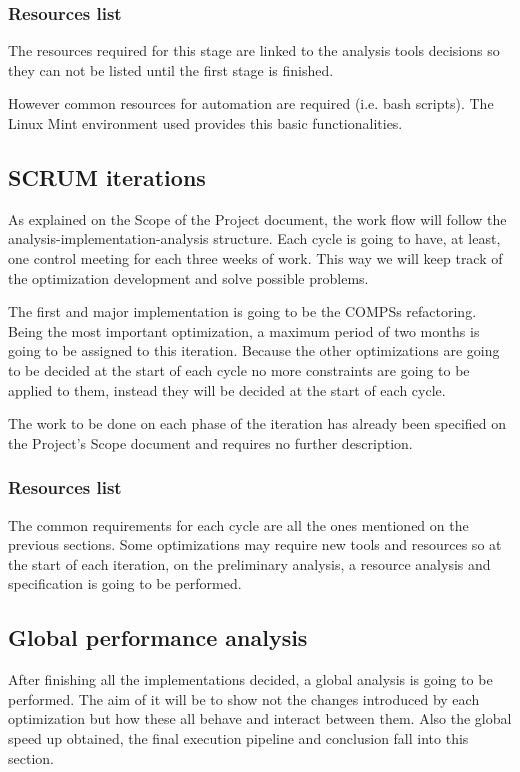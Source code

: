 \subsubsection{Resources list}

The resources required for this stage are linked to the analysis tools decisions so they can not be listed until the first stage is finished.

However common resources for automation are required (i.e. bash scripts). The Linux Mint environment used provides this basic functionalities.

\subsection{SCRUM iterations}

As explained on the Scope of the Project document, the work flow will follow the analysis-implementation-analysis structure. Each cycle is going to have, at least, one control meeting for each three weeks of work. This way we will keep track of the optimization development and solve possible problems.

The first and major implementation is going to be the COMPSs refactoring. Being the most important optimization, a maximum period of two months is going to be assigned to this iteration. Because the other optimizations are going to be decided at the start of each cycle no more constraints are going to be applied to them, instead they will be decided at the start of each cycle.

The work to be done on each phase of the iteration has already been specified on the Project's Scope document and requires no further description.


\subsubsection{Resources list}

The common requirements for each cycle are all the ones mentioned on the previous sections. Some optimizations may require new tools and resources so at the start of each iteration, on the preliminary analysis, a resource analysis and specification is going to be performed.

\subsection{Global performance analysis}

After finishing all the implementations decided, a global analysis is going to be performed. The aim of it will be to show not the changes introduced by each optimization but how these all behave and interact between them. Also the global speed up obtained, the final execution pipeline and conclusion fall into this section.

